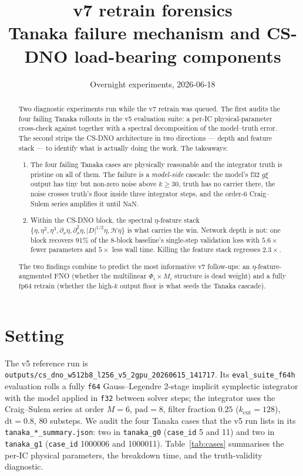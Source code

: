\documentclass[11pt,letterpaper]{article}
\title{\textbf{v7 retrain forensics}\\[2pt]
       \large Tanaka failure mechanism and CS-DNO load-bearing components}
\author{Overnight experiments, 2026-06-18}
\date{}
\newcommand{\Hop}{\mathcal{H}}
\begin{document}
\maketitle

\begin{abstract}
\noindent
Two diagnostic experiments run while the v7 retrain was queued. The first audits the four
failing Tanaka rollouts in the v5 evaluation suite: a per-IC physical-parameter cross-check
against \cite{xu2009} together with a spectral decomposition of the model--truth error.
The second strips the CS-DNO architecture in two directions --- depth and feature stack ---
to identify what is actually doing the work. The takeaways:
\begin{enumerate}[leftmargin=1.4em,topsep=0pt,itemsep=2pt]
  \item The four failing Tanaka cases are physically reasonable and the integrator truth is
        pristine on all of them. The failure is a \emph{model-side} cascade: the model's f32
        $g\xi$ output has tiny but non-zero noise above $k\!\geq\!30$, truth has no carrier
        there, the noise crosses truth's floor inside three integrator steps, and the
        order-$6$ Craig--Sulem series amplifies it until $\mathrm{NaN}$.
  \item Within the CS-DNO block, the spectral $\eta$-feature stack
        $\{\eta,\eta^{2},\eta^{3},\partial_{x}\eta,\partial_{x}^{2}\eta,|D|^{1/2}\eta,\Hop\eta\}$
        is what carries the win. Network depth is not: one block recovers
        91\% of the 8-block baseline's single-step validation loss with $5.6\times$ fewer
        parameters and $5\times$ less wall time. Killing the feature stack regresses
        $2.3\times$.
\end{enumerate}
The two findings combine to predict the most informative v7 follow-ups: an
$\eta$-feature-augmented FNO (whether the multilinear $\Phi_{i}\!\times\!M_{i}$ structure
is dead weight) and a fully $\mathrm{fp64}$ retrain (whether the high-$k$ output floor is what
seeds the Tanaka cascade).
\end{abstract}

\section{Setting}

The v5 reference run is
\texttt{outputs/cs\_dno\_w512b8\_l256\_v5\_2gpu\_20260615\_141717}. Its
\texttt{eval\_suite\_f64h} evaluation rolls a fully \texttt{f64} Gauss--Legendre 2-stage
implicit symplectic integrator with the model applied in \texttt{f32} between solver steps;
the integrator uses the Craig--Sulem series at order $M\!=\!6$, $\mathrm{pad}\!=\!8$,
filter fraction $0.25$ ($k_{\mathrm{cut}}\!=\!128$), $\mathrm{dt}=0.8$, $80$ substeps. We
audit the four Tanaka cases that the v5 run lists in its
\texttt{tanaka\_*\_summary.json}: two in \texttt{tanaka\_g0} (\texttt{case\_id} 5 and 11)
and two in \texttt{tanaka\_g1} (\texttt{case\_id} 1000006 and 1000011). Table~\ref{tab:cases}
summarises the per-IC physical parameters, the breakdown time, and the truth-validity
diagnostic.
\end{document}

